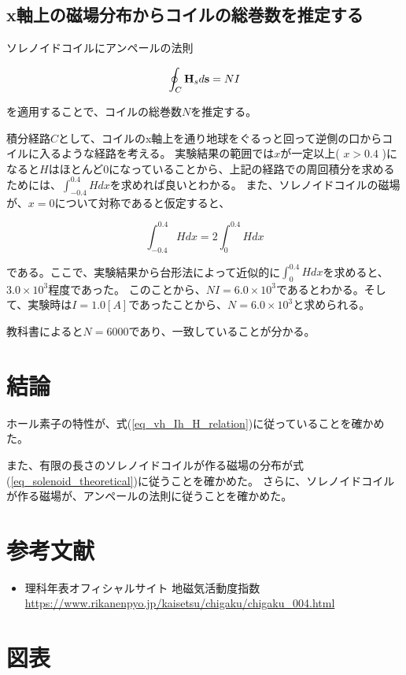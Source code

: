 \documentclass[uplatex,11pt]{jsarticle}
\newcommand{\er}[1]{式(\ref{#1})}
\begin{document}
\subsection{x軸上の磁場分布からコイルの総巻数を推定する}

ソレノイドコイルにアンペールの法則

\[
    \oint_C {\bf H}_s d{\bf s} = NI
\]

を適用することで、コイルの総巻数$N$を推定する。

積分経路$C$として、コイルのx軸上を通り地球をぐるっと回って逆側の口からコイルに入るような経路を考える。
実験結果の範囲では$x$が一定以上( $ x > 0.4 $ )になると$H$はほとんど0になっていることから、上記の経路での周回積分を求めるためには、$\int^{0.4}_{-0.4} H dx$を求めれば良いとわかる。
また、ソレノイドコイルの磁場が、$x=0$について対称であると仮定すると、

\[
\int^{0.4}_{-0.4} H dx = 2 \int^{0.4}_0 H dx
\]

である。ここで、実験結果から台形法によって近似的に$\int^{0.4}_0 H dx$を求めると、$3.0 \times 10 ^ 3 $程度であった。
このことから、$NI = 6.0 \times 10^3$であるとわかる。そして、実験時は$I = 1.0[A]$であったことから、$N = 6.0 \times 10^3$と求められる。

教科書によると$N = 6000$であり、一致していることが分かる。

\section{結論}

ホール素子の特性が、\er{eq_vh_Ih_H_relation}に従っていることを確かめた。

また、有限の長さのソレノイドコイルが作る磁場の分布が\er{eq_solenoid_theoretical}に従うことを確かめた。
さらに、ソレノイドコイルが作る磁場が、アンペールの法則に従うことを確かめた。

\section{参考文献}

\begin{itemize}
    \item 理科年表オフィシャルサイト 地磁気活動度指数 \url{https://www.rikanenpyo.jp/kaisetsu/chigaku/chigaku_004.html}
\end{itemize}


\newpage
\section*{図表}
\end{document}
